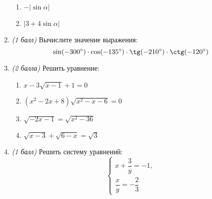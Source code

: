 \documentclass[12pt, a4paper]{article}
\begin{document}
\begin{enumerate}
\begin{multicols}{2}
\begin{enumerate}[label=\asbuk*)]
			\item $-|\sin\alpha|$
			\item $|3+4\sin\alpha|$
		\end{enumerate}
	\end{multicols}	
	\item \textit{(1 балл)} Вычислите значение выражения:
	$$\sin(-300\degree)\cdot\cos(-135\degree)\cdot\tg(-210\degree)\cdot\ctg(-120\degree)$$
	\item \textit{(2 балла)} Решить уравнение:
	\begin{enumerate}[label=\asbuk*)]
		\item $x-3\sqrt{x-1}+1=0$
		\item $(x^2-2x+8)\sqrt{x^2-x-6}=0$
		\item $\sqrt{-2x-1}=\sqrt{x^2-36}$
		\item $\sqrt{x-3}+\sqrt{6-x}=\sqrt{3}$
	\end{enumerate}
	\item \textit{(1 балл)} Решить систему уравнений:
	$$
	\left\{
	\begin{aligned}
		x+\dfrac{3}{y}=-1,\\
		\dfrac{x}{y}=-\dfrac{2}{3}
	\end{aligned}
	\right.
	$$
	
	
\end{enumerate}
\end{document}
